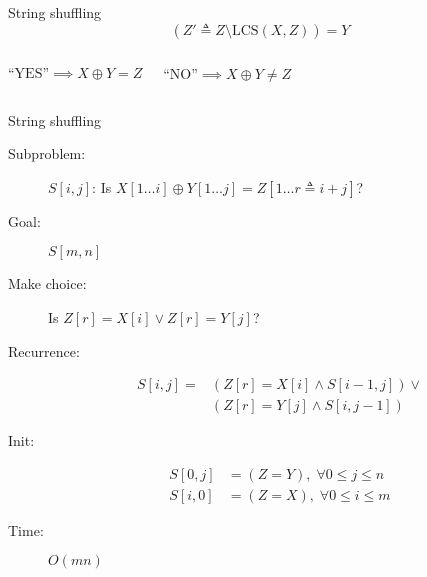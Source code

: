 \begin{frame}{String shuffling}
  \[
	(Z' \triangleq Z \setminus \text{LCS}(X, Z)) = Y
  \]

  \vspace{0.60cm}
  \begin{columns}
	  \[
		\text{``YES''} \implies X \oplus Y = Z
	  \]

	  \[
		\text{``NO''} \implies X \oplus Y \neq Z
	  \]
	  
  \end{columns}
\end{frame}
\begin{frame}{String shuffling}
  \begin{description}
	\item[Subproblem:] $S[i,j]$: Is $X[1 \dots i] \oplus Y[1 \dots j] = Z[1 \dots r \triangleq i + j]$?
	\item[Goal:] $S[m,n]$
	  \pause
	\item[Make choice:] Is $Z[r] = X[i] \lor Z[r] = Y[j]$?
	\item[Recurrence:] 
	  \begin{align*}
		S[i,j] = &(Z[r] = X[i] \land S[i-1,j]) \lor \\
			&(Z[r] = Y[j] \land S[i,j-1])
	  \end{align*}
	  \pause
	\item[Init:]
	  \begin{align*}
		S[0,j] &= (Z = Y), \; \forall 0 \le j \le n  \\
		S[i,0] &= (Z = X), \; \forall 0 \le i \le m
	  \end{align*}
	\item[Time:] $O(mn)$
  \end{description}
\end{frame}
